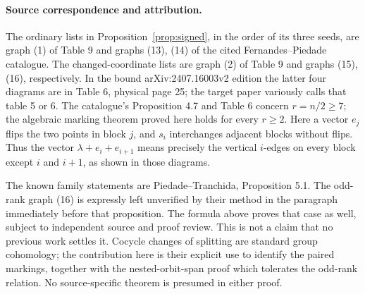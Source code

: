 \paragraph{Source correspondence and attribution.}
The ordinary lists in Proposition~\ref{prop:signed}, in the order of
its three seeds, are graph (1) of Table 9 and graphs (13), (14) of the
cited Fernandes--Piedade catalogue. The changed-coordinate lists are
graph (2) of Table 9 and graphs (15), (16), respectively. In the bound
arXiv:2407.16003v2 edition the latter four diagrams are in Table 6,
physical page 25; the target paper variously calls that table 5 or 6.
The catalogue's Proposition 4.7 and Table 6 concern $r=n/2\geq7$;
the algebraic marking theorem proved here holds for every $r\geq2$.
Here a vector $e_j$ flips the two points in block $j$, and $s_i$
interchanges adjacent blocks without flips. Thus the vector
$\lambda+e_i+e_{i+1}$ means precisely the vertical $i$-edges on every
block except $i$ and $i+1$, as shown in those diagrams.

The known family statements are Piedade--Tranchida, Proposition 5.1.
The odd-rank graph (16) is expressly left unverified by their method
in the paragraph immediately before that proposition. The formula
above proves that case as well, subject to independent source and proof
review. This is not a claim that no previous work settles it. Cocycle
changes of splitting are standard group cohomology; the contribution
here is their explicit use to identify the paired markings, together
with the nested-orbit-span proof which tolerates the odd-rank relation.
No source-specific theorem is presumed in either proof.
